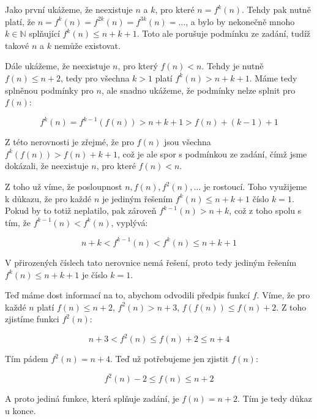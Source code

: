\documentclass{fkssolpub}
\author{Ondřej Sedláček}
\begin{document}
Jako první ukážeme, že neexistuje $n$ a $k$, pro které $n = f^k(n)$. Tehdy pak nutně platí, že $n = f^k(n) = f^{2k}(n) = f^{3k}(n) = \dots$, a bylo by nekonečně mnoho $k \in \mathbb{N}$ splňující $f^k(n) \leq n + k + 1$. Toto ale porušuje podmínku ze zadání, tudíž takové $n$ a $k$ nemůže existovat.

Dále ukážeme, že neexistuje $n$, pro který $f(n) < n$. Tehdy je nutně $f(n) \leq n + 2$, tedy pro všechna $k > 1$ platí $f^k(n) > n + k + 1$. Máme tedy splněnou podmínky pro $n$, ale snadno ukážeme, že podmínky nelze splnit pro $f(n)$:

\[
	f^k(n) = f^{k - 1}(f(n)) > n + k + 1 > f(n) + (k - 1) + 1
\]

Z této nerovnosti je zřejmé, že pro $f(n)$ jsou všechna $f^k(f(n)) > f(n) + k + 1$, což je ale spor s podmínkou ze zadání, čímž jsme dokázali, že neexistuje $n$, pro které $f(n) < n$.

Z toho už víme, že posloupnost $n, f(n), f^2(n), \dots$ je rostoucí. Toho využijeme k důkazu, že pro každé $n$ je jediným řešením $f^k(n) \leq n + k + 1$ číslo $k = 1$. Pokud by to totiž neplatilo, pak zároveň $f^{k - 1}(n) > n + k$, což z toho spolu s tím, že $f^{k - 1}(n) < f^k(n)$, vyplývá:

\[
	n + k < f^{k - 1}(n) < f^k(n) \leq n + k + 1
\]

V přirozených číslech tato nerovnice nemá řešení, proto tedy jediným řešením $f^k(n) \leq n + k + 1$ je číslo $k = 1$.

Teď máme dost informací na to, abychom odvodili předpis funkcí $f$. Víme, že pro každé $n$ platí $f(n) \leq n + 2$, $f^2(n) > n + 3$, $f(f(n)) \leq f(n) + 2$. Z toho zjistíme funkci $f^2(n)$:

\[
	n + 3 < f^2(n) \leq f(n) + 2 \leq n + 4
\]

Tím pádem $f^2(n) = n + 4$. Teď už potřebujeme jen zjistit $f(n)$:

\[
	f^2(n) - 2 \leq f(n) \leq n + 2
\]

A proto jediná funkce, která splňuje zadání, je $f(n) = n + 2$. Tím je tedy důkaz u konce.
\end{document}
